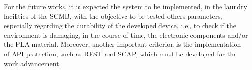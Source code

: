 For the future works, it is expected the system to be implemented, in the laundry facilities of the \gls{SCMB}, with the objective to be tested others parameters, especially regarding the durability of the developed device, i.e., to check if the environment is damaging, in the course of time, the electronic components and/or the PLA material. Moreover, another important criterion is the implementation of \gls{API} protection, such as REST and SOAP, which must be developed for the work advancement.